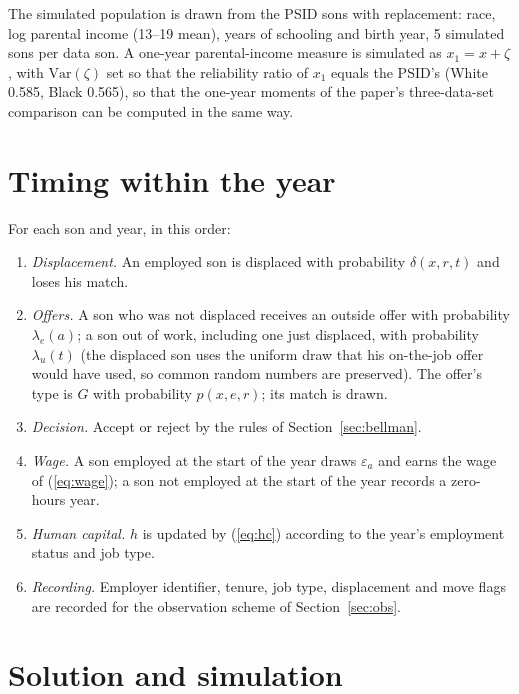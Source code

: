 \documentclass[11pt]{article}
\newcommand{\1}{\mathbf{1}}
\begin{document}
The simulated population is drawn from the PSID sons with replacement: race, log parental income (13--19 mean), years of
schooling and birth year, 5 simulated sons per data son. A one-year parental-income measure is simulated as
$x_1 = x + \zeta$, with $\mathrm{Var}(\zeta)$ set so that the reliability ratio of $x_1$ equals the PSID's (White 0.585,
Black 0.565), so that the one-year moments of the paper's three-data-set comparison can be computed in the same way.

\section{Timing within the year}\label{sec:timing}

For each son and year, in this order:
\begin{enumerate}
  \item \textit{Displacement.} An employed son is displaced with probability $\delta(x, r, t)$ and loses his match.
  \item \textit{Offers.} A son who was not displaced receives an outside offer with probability $\lambda_e(a)$; a son
  out of work, including one just displaced, with probability $\lambda_u(t)$ (the displaced son uses the uniform draw
  that his on-the-job offer would have used, so common random numbers are preserved). The offer's type is $G$ with probability
  $p(x, e, r)$; its match is drawn.
  \item \textit{Decision.} Accept or reject by the rules of Section~\ref{sec:bellman}.
  \item \textit{Wage.} A son employed at the start of the year draws $\varepsilon_a$ and earns the wage of
  (\ref{eq:wage}); a son not employed at the start of the year records a zero-hours year.
  \item \textit{Human capital.} $h$ is updated by (\ref{eq:hc}) according to the year's employment status and job type.
  \item \textit{Recording.} Employer identifier, tenure, job type, displacement and move flags are recorded for the
  observation scheme of Section~\ref{sec:obs}.
\end{enumerate}

\section{Solution and simulation}\label{sec:solution}
\end{document}
